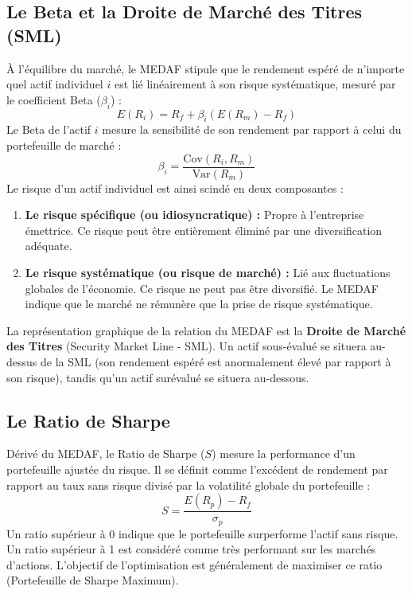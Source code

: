 \subsection{Le Beta et la Droite de Marché des Titres (SML)}
À l'équilibre du marché, le MEDAF stipule que le rendement espéré de n'importe quel actif individuel $i$ est lié linéairement à son risque systématique, mesuré par le coefficient Beta ($\beta_i$) :
\begin{equation}
    E(R_i) = R_f + \beta_i (E(R_m) - R_f)
\end{equation}
Le Beta de l'actif $i$ mesure la sensibilité de son rendement par rapport à celui du portefeuille de marché :
\begin{equation}
    \beta_i = \frac{\text{Cov}(R_i, R_m)}{\text{Var}(R_m)}
\end{equation}
Le risque d'un actif individuel est ainsi scindé en deux composantes :
\begin{enumerate}
    \item \textbf{Le risque spécifique (ou idiosyncratique) :} Propre à l'entreprise émettrice. Ce risque peut être entièrement éliminé par une diversification adéquate.
    \item \textbf{Le risque systématique (ou risque de marché) :} Lié aux fluctuations globales de l'économie. Ce risque ne peut pas être diversifié. Le MEDAF indique que le marché ne rémunère que la prise de risque systématique.
\end{enumerate}

La représentation graphique de la relation du MEDAF est la \textbf{Droite de Marché des Titres} (Security Market Line - SML). Un actif sous-évalué se situera au-dessus de la SML (son rendement espéré est anormalement élevé par rapport à son risque), tandis qu'un actif surévalué se situera au-dessous.

\subsection{Le Ratio de Sharpe}
Dérivé du MEDAF, le Ratio de Sharpe ($S$) mesure la performance d'un portefeuille ajustée du risque. Il se définit comme l'excédent de rendement par rapport au taux sans risque divisé par la volatilité globale du portefeuille :
\begin{equation}
    S = \frac{E(R_p) - R_f}{\sigma_p}
\end{equation}
Un ratio supérieur à 0 indique que le portefeuille surperforme l'actif sans risque. Un ratio supérieur à 1 est considéré comme très performant sur les marchés d'actions. L'objectif de l'optimisation est généralement de maximiser ce ratio (Portefeuille de Sharpe Maximum).


